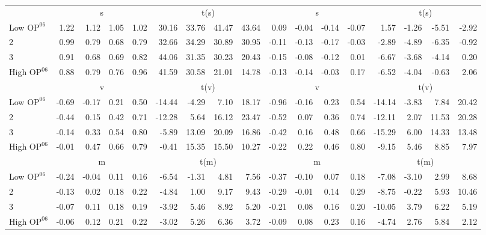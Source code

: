 \begin{table}[!ht]
\begin{tabular}{lrrrrrrrrrrrrrrrr}
  
     & \multicolumn{4}{c}{s} & \multicolumn{4}{c}{t(s)}  & \multicolumn{4}{c}{s} & \multicolumn{4}{c}{t(s)}   \\
     \cmidrule(r){2-5} \cmidrule(r){6-9}  \cmidrule(r){10-13} \cmidrule(r){14-17} 
    Low $\text{OP}^{06}$  & 1.22  & 1.12  & 1.05  & 1.02  & 30.16  & 33.76  & 41.47  & 43.64  & 0.09  & -0.04  & -0.14  & -0.07  & 1.57  & -1.26  & -5.51  & -2.92   \\
    2  & 0.99  & 0.79  & 0.68  & 0.79  & 32.66  & 34.29  & 30.89  & 30.95  & -0.11  & -0.13  & -0.17  & -0.03  & -2.89  & -4.89  & -6.35  & -0.92   \\
    3  & 0.91  & 0.68  & 0.69  & 0.82  & 44.06  & 31.35  & 30.23  & 20.43  & -0.15  & -0.08  & -0.12  & 0.01  & -6.67  & -3.68  & -4.14  & 0.20   \\
    High $\text{OP}^{06}$  & 0.88  & 0.79  & 0.76  & 0.96  & 41.59  & 30.58  & 21.01  & 14.78  & -0.13  & -0.14  & -0.03  & 0.17  & -6.52  & -4.04  & -0.63  & 2.06   \\
    
  
     & \multicolumn{4}{c}{v} & \multicolumn{4}{c}{t(v)}  & \multicolumn{4}{c}{v} & \multicolumn{4}{c}{t(v)}   \\
     \cmidrule(r){2-5} \cmidrule(r){6-9}  \cmidrule(r){10-13} \cmidrule(r){14-17} 
    Low $\text{OP}^{06}$  & -0.69  & -0.17  & 0.21  & 0.50  & -14.44  & -4.29  & 7.10  & 18.17  & -0.96  & -0.16  & 0.23  & 0.54  & -14.14  & -3.83  & 7.84  & 20.42   \\
    2  & -0.44  & 0.15  & 0.42  & 0.71  & -12.28  & 5.64  & 16.12  & 23.47  & -0.52  & 0.07  & 0.36  & 0.74  & -12.11  & 2.07  & 11.53  & 20.28   \\
    3  & -0.14  & 0.33  & 0.54  & 0.80  & -5.89  & 13.09  & 20.09  & 16.86  & -0.42  & 0.16  & 0.48  & 0.66  & -15.29  & 6.00  & 14.33  & 13.48   \\
    High $\text{OP}^{06}$  & -0.01  & 0.47  & 0.66  & 0.79  & -0.41  & 15.35  & 15.50  & 10.27  & -0.22  & 0.22  & 0.46  & 0.80  & -9.15  & 5.46  & 8.85  & 7.97   \\
    
  
     & \multicolumn{4}{c}{m} & \multicolumn{4}{c}{t(m)}  & \multicolumn{4}{c}{m} & \multicolumn{4}{c}{t(m)}   \\
     \cmidrule(r){2-5} \cmidrule(r){6-9}  \cmidrule(r){10-13} \cmidrule(r){14-17} 
    Low $\text{OP}^{06}$  & -0.24  & -0.04  & 0.11  & 0.16  & -6.54  & -1.31  & 4.81  & 7.56  & -0.37  & -0.10  & 0.07  & 0.18  & -7.08  & -3.10  & 2.99  & 8.68   \\
    2  & -0.13  & 0.02  & 0.18  & 0.22  & -4.84  & 1.00  & 9.17  & 9.43  & -0.29  & -0.01  & 0.14  & 0.29  & -8.75  & -0.22  & 5.93  & 10.46   \\
    3  & -0.07  & 0.11  & 0.18  & 0.19  & -3.92  & 5.46  & 8.92  & 5.20  & -0.21  & 0.08  & 0.16  & 0.20  & -10.05  & 3.79  & 6.22  & 5.19   \\
    High $\text{OP}^{06}$  & -0.06  & 0.12  & 0.21  & 0.22  & -3.02  & 5.26  & 6.36  & 3.72  & -0.09  & 0.08  & 0.23  & 0.16  & -4.74  & 2.76  & 5.84  & 2.12   \\
    

\end{tabular}
\end{table}
